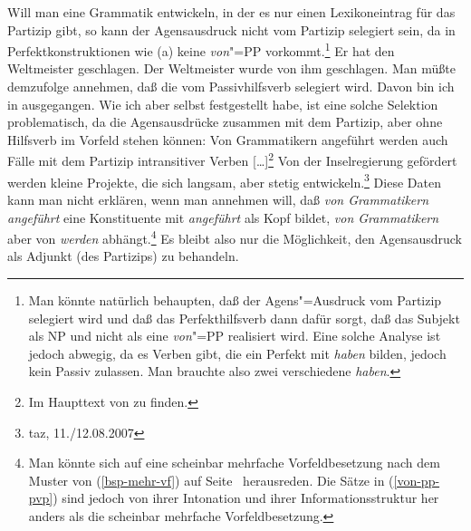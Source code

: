 Will man eine Grammatik entwickeln, in der es nur einen Lexikoneintrag für das Partizip gibt,
so kann der Agensausdruck nicht vom Partizip selegiert sein, da in Perfektkonstruktionen
wie (a) keine \emph{von}"=PP vorkommt.\footnote{
  Man könnte natürlich behaupten, daß der Agens"=Ausdruck vom Partizip selegiert wird
  und daß das Perfekthilfsverb dann dafür sorgt, daß das Subjekt als NP und 
  nicht als eine \emph{von}"=PP realisiert wird. Eine solche Analyse ist jedoch abwegig,
  da es Verben gibt, die ein Perfekt mit \emph{haben} bilden, jedoch kein Passiv zulassen.
  \eal
  \zl
  Man brauchte also zwei verschiedene \emph{haben}.
}
\eal
\ex Er hat den Weltmeister geschlagen.
\ex Der Weltmeister wurde von ihm geschlagen.
\zl
Man müßte demzufolge annehmen, daß die \vonpp vom Passivhilfsverb selegiert wird. Davon bin ich
in  ausgegangen. Wie ich aber selbst festgestellt habe, ist eine solche Selektion problematisch,
da die Agensausdrücke zusammen mit dem Partizip, aber ohne Hilfsverb im Vorfeld stehen können:
\eal
\label{von-pp-pvp}
\ex Von Grammatikern angeführt werden auch Fälle mit dem Partizip intransitiver Verben [\ldots]\footnote{
        Im Haupttext von  zu finden.
}
\ex Von der Inselregierung gefördert werden kleine Projekte, die sich langsam, aber stetig
        entwickeln.\footnote{
          taz, 11./12.08.2007
}
\zl
Diese Daten kann man nicht erklären, wenn man annehmen will, daß \emph{von Grammatikern angeführt} eine
Konstituente mit \emph{angeführt} als Kopf bildet, \emph{von Grammatikern} aber von \emph{werden} abhängt.\footnote{
  Man könnte sich auf eine scheinbar mehrfache Vorfeldbesetzung nach dem Muster von (\ref{bsp-mehr-vf})
  auf Seite~\pageref{bsp-mehr-vf} herausreden. Die Sätze in (\ref{von-pp-pvp}) sind jedoch
  von ihrer Intonation und ihrer Informationsstruktur her anders als die scheinbar mehrfache Vorfeldbesetzung.%
}
Es bleibt also nur die Möglichkeit, den Agensausdruck als Adjunkt (des Partizips) zu behandeln.

